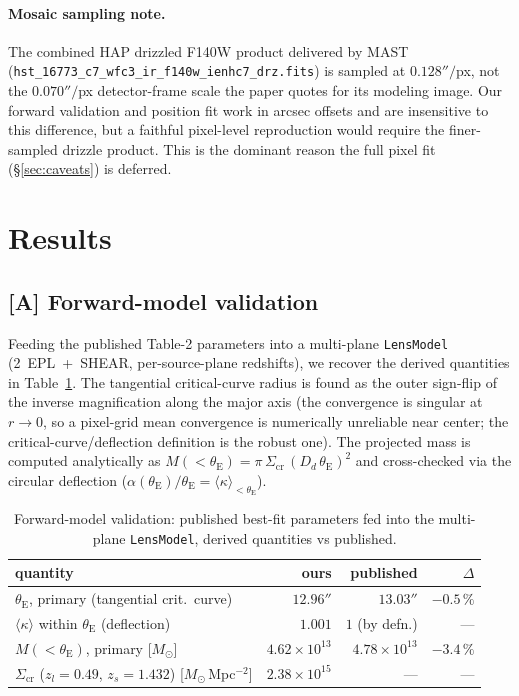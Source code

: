 \documentclass[11pt,letterpaper]{article}
\newcommand{\thetaE}{\ensuremath{\theta_{\mathrm{E}}}}
\newcommand{\Msun}{\ensuremath{M_\odot}}
\newcommand{\zs}{\ensuremath{z_s}}
\newcommand{\zl}{\ensuremath{z_l}}
\newcommand{\Sigmacrit}{\ensuremath{\Sigma_{\mathrm{cr}}}}
\begin{document}
\paragraph{Mosaic sampling note.} The combined HAP drizzled F140W product
delivered by MAST (\texttt{hst\_16773\_c7\_wfc3\_ir\_f140w\_ienhc7\_drz.fits})
is sampled at $0.128''/$px, not the $0.070''/$px detector-frame scale the paper
quotes for its modeling image. Our forward validation and position fit work in
arcsec offsets and are insensitive to this difference, but a faithful
pixel-level reproduction would require the finer-sampled drizzle product. This
is the dominant reason the full pixel fit (\S\ref{sec:caveats}) is deferred.

\section{Results}

\subsection{[A] Forward-model validation}
\label{sec:forward}

Feeding the published Table-2 parameters into a multi-plane
\texttt{LensModel} (2~EPL~+~SHEAR, per-source-plane redshifts), we recover the
derived quantities in Table~\ref{tab:forward}. The tangential critical-curve
radius is found as the outer sign-flip of the inverse magnification along the
major axis (the convergence is singular at $r\to0$, so a pixel-grid mean
convergence is numerically unreliable near center; the
critical-curve/deflection definition is the robust one). The projected mass is
computed analytically as $M(<\thetaE) = \pi\,\Sigmacrit\,(D_d\,\thetaE)^2$ and
cross-checked via the circular deflection
($\alpha(\thetaE)/\thetaE = \langle\kappa\rangle_{<\thetaE}$).

\begin{table}[ht]
\centering
\caption{Forward-model validation: published best-fit parameters fed into the
multi-plane \texttt{LensModel}, derived quantities vs published.}
\label{tab:forward}
\begin{tabular}{lrrr}
\toprule
quantity & ours & published & $\Delta$ \\
\midrule
$\thetaE$, primary (tangential crit.\ curve) & $12.96''$  & $13.03''$ & $-0.5\,\%$ \\
$\langle\kappa\rangle$ within $\thetaE$ (deflection) & $1.001$ & $1$ (by defn.) & --- \\
$M(<\thetaE)$, primary [$\Msun$] & $4.62\times10^{13}$ & $4.78\times10^{13}$ & $-3.4\,\%$ \\
$\Sigmacrit$ ($\zl=0.49$, $\zs=1.432$) [$\Msun$\,Mpc$^{-2}$] & $2.38\times10^{15}$ & --- & --- \\
\bottomrule
\end{tabular}
\end{table}
\end{document}
